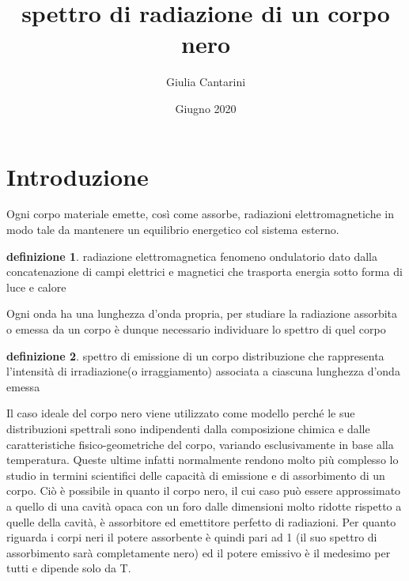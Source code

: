 \documentclass{article}
\title{spettro di radiazione di un corpo nero}
\author{Giulia Cantarini}
\date{Giugno 2020}
\theoremstyle{definition}
\newtheorem{defin}{definizione}[section]
\begin{document}
\maketitle


\section*{Introduzione}
Ogni corpo materiale emette, così come assorbe, radiazioni elettromagnetiche in modo tale da mantenere un equilibrio energetico col sistema esterno.

\begin{defin}{radiazione elettromagnetica}
fenomeno ondulatorio dato dalla concatenazione di campi elettrici e magnetici che trasporta energia sotto forma di luce e calore
\end{defin}
Ogni onda ha una lunghezza d'onda propria, per studiare la radiazione assorbita o emessa da un corpo è dunque necessario individuare lo spettro di quel corpo
\begin{defin}{spettro di emissione di un corpo}
distribuzione che rappresenta l'intensità di irradiazione(o irraggiamento) associata a ciascuna lunghezza d'onda emessa
\end{defin}
Il caso ideale del corpo nero viene utilizzato come modello perché le sue distribuzioni spettrali sono indipendenti dalla composizione chimica e dalle caratteristiche fisico-geometriche del corpo, variando esclusivamente in base alla temperatura. Queste ultime infatti normalmente rendono molto più complesso lo studio in termini scientifici delle capacità di emissione e di assorbimento di un corpo.
Ciò è possibile in quanto il corpo nero, il cui caso può essere approssimato a quello di una cavità opaca con un foro dalle dimensioni molto ridotte rispetto a quelle della cavità, è assorbitore ed emettitore perfetto di radiazioni. Per quanto riguarda i corpi neri il potere assorbente è quindi pari ad 1 (il suo spettro di assorbimento sarà completamente nero) ed il potere emissivo è il medesimo per tutti e dipende solo da T.
\end{document}
